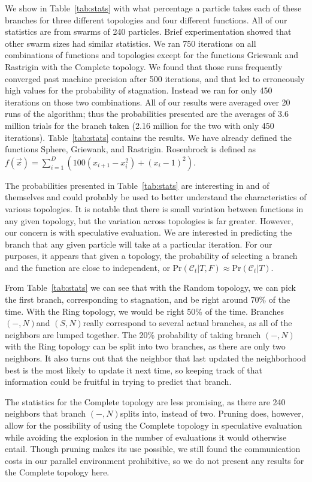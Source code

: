 \documentclass[journal,letterpaper]{IEEEtran}
\providecommand{\caseset}{\ensuremath{\mathcal{C}}}
\providecommand{\casepN}{\ensuremath{(-,N)}}
\providecommand{\casexN}{\ensuremath{(S,N)}}
\providecommand{\prob}{\ensuremath{\mathrm{Pr}}}
\begin{document}
We show in Table~\ref{tab:stats} with what percentage a particle takes each of
these branches for three different topologies and four different functions.
All of our statistics are from swarms of 240 particles.  Brief experimentation
showed that other swarm sizes had similar statistics.  We ran 750 iterations on
all combinations of functions and topologies except for the functions Griewank
and Rastrigin with the Complete topology.  We found that those runs frequently
converged past machine precision after 500 iterations, and that led to
erroneously high values for the probability of stagnation.  Instead we ran for
only 450 iterations on those two combinations.  All of our results were
averaged over 20 runs of the algorithm; thus the probabilities presented are
the averages of 3.6 million trials for the branch taken (2.16 million for the
two with only 450 iterations).  Table~\ref{tab:stats} contains the results.  We
have already defined the functions Sphere, Griewank, and Rastrigin.  Rosenbrock
is defined as $f(\Vec{x}) = \sum_{i=1}^D
\left(100(x_{i+1}-x_i^2)+(x_i-1)^2\right)$.

The probabilities presented in Table~\ref{tab:stats} are interesting in and of
themselves and could probably be used to better understand the characteristics
of various topologies.  It is notable that there is small variation between
functions in any given topology, but the variation across topologies is far
greater.  However, our concern is with speculative evaluation.  We are
interested in predicting the branch that any given particle will take at a
particular iteration.  For our purposes, it appears that given a topology, the
probability of selecting a branch and the function are close to independent, or
$\prob(\caseset_t|T,F) \approx \prob(\caseset_t|T)$.

From Table~\ref{tab:stats} we can see that with the Random topology, we can
pick the first branch, corresponding to stagnation, and be right around 70\% of
the time.  With the Ring topology, we would be right 50\% of the time.
Branches \casepN and \casexN really correspond to several actual branches, as
all of the neighbors are lumped together.  The 20\% probability of taking
branch \casepN with the Ring topology can be split into two branches, as there
are only two neighbors.  It also turns out that the neighbor that last updated
the neighborhood best is the most likely to update it next time, so keeping
track of that information could be fruitful in trying to predict that branch.

The statistics for the Complete topology are less promising, as there are 240
neighbors that branch \casepN splits into, instead of two.  Pruning does,
however, allow for the possibility of using the Complete topology in
speculative evaluation while avoiding the explosion in the number of
evaluations it would otherwise entail.  Though pruning makes its use possible,
we still found the communication costs in our parallel environment prohibitive,
so we do not present any results for the Complete topology here.
\end{document}
